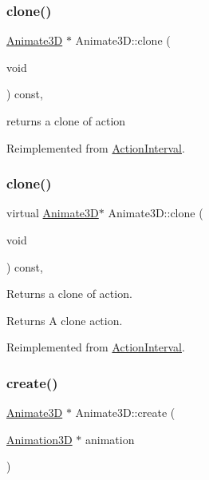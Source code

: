 \subsubsection{\texorpdfstring{clone()}{clone()}\hspace{0.1cm}{\footnotesize\ttfamily [1/2]}}
{\footnotesize\ttfamily \hyperlink{classAnimate3D}{Animate3D} $\ast$ Animate3\+D\+::clone (\begin{DoxyParamCaption}\item[{void}]{ }\end{DoxyParamCaption}) const\hspace{0.3cm}{\ttfamily [override]}, {\ttfamily [virtual]}}

returns a clone of action 

Reimplemented from \hyperlink{classActionInterval_abc93ce0c2f54a90eb216a7803f25f44a}{Action\+Interval}.

\mbox{\label{classAnimate3D_a1de37c3ea3435bc8961d6e5d6d3ac50d}} 
\subsubsection{\texorpdfstring{clone()}{clone()}\hspace{0.1cm}{\footnotesize\ttfamily [2/2]}}
{\footnotesize\ttfamily virtual \hyperlink{classAnimate3D}{Animate3D}$\ast$ Animate3\+D\+::clone (\begin{DoxyParamCaption}\item[{void}]{ }\end{DoxyParamCaption}) const\hspace{0.3cm}{\ttfamily [override]}, {\ttfamily [virtual]}}

Returns a clone of action.

\begin{DoxyReturn}{Returns}
A clone action. 
\end{DoxyReturn}


Reimplemented from \hyperlink{classActionInterval_abc93ce0c2f54a90eb216a7803f25f44a}{Action\+Interval}.

\mbox{\label{classAnimate3D_a06f3e2e2a62513821684d5c406772b22}} 
\subsubsection{\texorpdfstring{create()}{create()}\hspace{0.1cm}{\footnotesize\ttfamily [1/4]}}
{\footnotesize\ttfamily \hyperlink{classAnimate3D}{Animate3D} $\ast$ Animate3\+D\+::create (\begin{DoxyParamCaption}\item[{\hyperlink{classAnimation3D}{Animation3D} $\ast$}]{animation }\end{DoxyParamCaption})\hspace{0.3cm}{\ttfamily [static]}}

